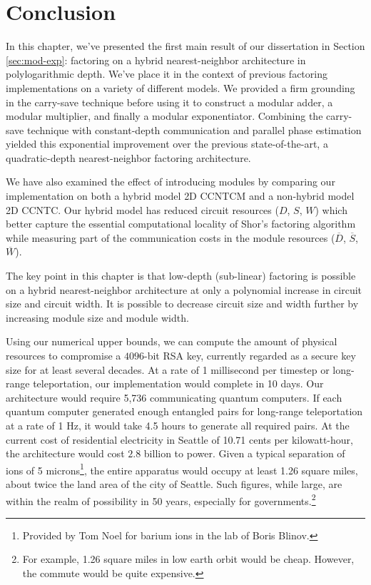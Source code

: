 \section{Conclusion}
\label{sec:fpl-conclude}

In this chapter, we've presented the first main result of
our dissertation in Section \ref{sec:mod-exp}:
factoring on a hybrid nearest-neighbor architecture in polylogarithmic depth.
We've place it in the context of previous factoring implementations on a
variety of different models. We provided a firm grounding
in the carry-save technique before using it to construct
a modular adder, a modular multiplier, and finally a
modular exponentiator. Combining the carry-save technique
with constant-depth
communication and parallel phase estimation yielded
this exponential improvement over the previous
state-of-the-art, a quadratic-depth nearest-neighbor
factoring architecture.

We have also examined the
effect of introducing modules by comparing our
implementation on both a hybrid model \textsf{2D CCNTCM}
and a non-hybrid model \textsf{2D CCNTC}.
Our hybrid model has reduced circuit resources
($D$, $S$, $W$) which better
capture the essential computational locality of Shor's factoring
algorithm while measuring part of the communication
costs in the module resources ($\overline{D}$, $\overline{S}$, $\overline{W}$).

The key point in this chapter is that
low-depth (sub-linear) factoring is possible
on a hybrid nearest-neighbor architecture
at only a polynomial increase in circuit size
and 
circuit width. It is possible to decrease
circuit size and width further by increasing
module size and module width.

Using our numerical
upper bounds, we can compute the amount of
physical resources to compromise a $4096$-bit
RSA key, currently regarded as a secure key size
for at least several decades. At a rate of
1 millisecond per timestep or long-range
teleportation, our implementation would
complete in 10 days.
 Our architecture
would require 5,736 communicating quantum
computers. If each quantum computer generated
enough entangled pairs for long-range
teleportation at a rate of 1 Hz, it would
take 4.5 hours to generate all required pairs.
At the current cost of residential electricity 
in Seattle of 10.71 cents per kilowatt-hour,
the architecture would cost $2.8$ billion
to power.
 Given a typical
separation of ions of 5 microns\footnote{Provided by Tom Noel for barium ions in the lab of Boris Blinov.},
the entire apparatus would occupy at least 1.26
square miles, about twice the land area of the city
of Seattle. Such figures, while large, are
within the realm of possibility in 50 years, especially
for governments.\footnote{For example,
1.26 square miles in low earth orbit would be cheap.
However, the commute would be quite expensive.}

